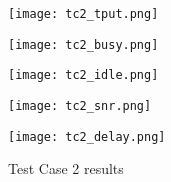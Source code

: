 \begin{figure}[!ht]
    \centering
    \begin{minipage}[b]{0.48\textwidth}
        \centering
        \texttt{[image: tc2\_tput.png]}
        \label{fig:tc2:tput}
    \end{minipage}
    \hfill
    \begin{minipage}[b]{0.48\textwidth}
        \centering
        \texttt{[image: tc2\_busy.png]}
        \label{fig:tc2:busy}
    \end{minipage}
    
    \vspace{0.1em}
    
    \begin{minipage}[b]{0.48\textwidth}
        \centering
        \texttt{[image: tc2\_idle.png]}
        \label{fig:tc2:idle}
    \end{minipage}
    \hfill
    \begin{minipage}[b]{0.48\textwidth}
        \centering
        \texttt{[image: tc2\_snr.png]}
        \label{fig:tc2:snr}
    \end{minipage}
    
    \vspace{0.1em}
    
    \begin{minipage}[b]{0.48\textwidth}
        \centering
        \texttt{[image: tc2\_delay.png]}
        \label{fig:tc2:l3delay}
    \end{minipage}
    
    \caption{Test Case 2 results}
    \label{fig:tc2:plots}
\end{figure}

